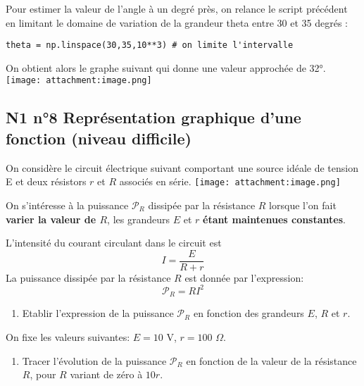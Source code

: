 \documentclass[11pt]{article}
\providecommand{\tightlist}{%
      \setlength{\itemsep}{0pt}\setlength{\parskip}{0pt}}
\begin{document}
    Pour estimer la valeur de l'angle à un degré près, on relance le script
précédent en limitant le domaine de variation de la grandeur theta entre
30 et 35 degrés :

\begin{verbatim}
theta = np.linspace(30,35,10**3) # on limite l'intervalle
\end{verbatim}

On obtient alors le graphe suivant qui donne une valeur approchée de
32°. \texttt{[image: attachment:image.png]}

    \hypertarget{n1-n8-repruxe9sentation-graphique-dune-fonction-niveau-difficile}{%
\subsection{N1 n°8 Représentation graphique d'une fonction (niveau
difficile)}\label{n1-n8-repruxe9sentation-graphique-dune-fonction-niveau-difficile}}

On considère le circuit électrique suivant comportant une source idéale
de tension E et deux résistors \(r\) et \(R\) associés en série.
\texttt{[image: attachment:image.png]}

On s'intéresse à la puissance \(\mathscr{P}_R\) dissipée par la
résistance \(R\) lorsque l'on fait \textbf{varier la valeur de \(R\)},
les grandeurs \(E\) et \(r\) \textbf{étant maintenues constantes}.

L'intensité du courant circulant dans le circuit est
\[I = \frac{E}{R+r}\] La puissance dissipée par la résistance \(R\) est
donnée par l'expression: \[\mathscr{P}_R=RI^2\]

\begin{enumerate}
\def\labelenumi{\alph{enumi})}
\tightlist
\item
  Etablir l'expression de la puissance \(\mathscr{P}_R\) en fonction des
  grandeurs \(E\), \(R\) et \(r\).
\end{enumerate}

On fixe les valeurs suivantes: \(E=10 \textrm{ V}\),
\(r = 100 \,\,\Omega\).

\begin{enumerate}
\def\labelenumi{\alph{enumi})}
\setcounter{enumi}{1}
\tightlist
\item
  Tracer l'évolution de la puissance \(\mathscr{P}_R\) en fonction de la
  valeur de la résistance \(R\), pour \(R\) variant de zéro à \(10r\).
\end{enumerate}
\end{document}

